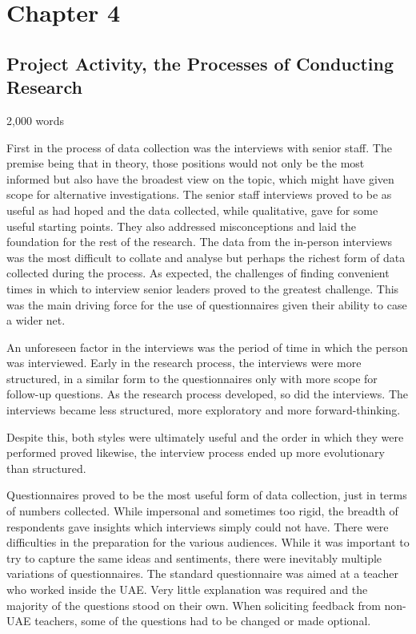 \section{Chapter 4}
\subsection{Project Activity, the Processes of Conducting Research}
2,000 words 

First in the process of data collection was the interviews with senior staff. The premise being that in theory, those positions would not only be the most informed but also have the broadest view on the topic, which might have given scope for alternative investigations. The senior staff interviews proved to be as useful as had hoped and the data collected, while qualitative, gave for some useful starting points. They also addressed misconceptions and laid the foundation for the rest of the research. The data from the in-person interviews was the most difficult to collate and analyse but perhaps the richest form of data collected during the process. As expected, the challenges of finding convenient times in which to interview senior leaders proved to the greatest challenge. This was the main driving force for the use of questionnaires given their ability to case a wider net. 

An unforeseen factor in the interviews was the period of time in which the person was interviewed. Early in the research process, the interviews were more structured, in a similar form to the questionnaires only with more scope for follow-up questions. As the research process developed, so did the interviews. The interviews became less structured, more exploratory and more forward-thinking.

Despite this, both styles were ultimately useful and the order in which they were performed proved likewise, the interview process ended up more evolutionary than structured.

Questionnaires proved to be the most useful form of data collection, just in terms of numbers collected. While impersonal and sometimes too rigid, the breadth of respondents gave insights which interviews simply could not have. There were difficulties in the preparation for the various audiences. While it was important to try to capture the same ideas and sentiments, there were inevitably multiple variations of questionnaires. The standard questionnaire was aimed at a teacher who worked inside the UAE. Very little explanation was required and the majority of the questions stood on their own. When soliciting feedback from non-UAE teachers, some of the questions had to be changed or made optional. 

